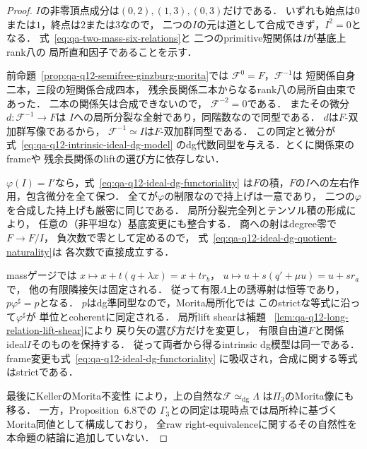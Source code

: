 \begin{proof}
$I$の非零頂点成分は$(0,2),(1,3),(0,3)$だけである．
いずれも始点は$0$または$1$，終点は$2$または$3$なので，
二つの$I$の元は道として合成できず，$I^2=0$となる．
式~\eqref{eq:qa-two-mass-six-relations}と
二つのprimitive短関係は$I$が基底上rank八の
局所直和因子であることを示す．

前命題~\ref{prop:qa-q12-semifree-ginzburg-morita}では
$\mathscr F^0=F$，$\mathscr F^{-1}$は
短関係自身二本，三段の短関係合成四本，
残余長関係二本からなるrank八の局所自由束であった．
二本の関係矢は合成できないので，
$\mathscr F^{-2}=0$である．
またその微分$d:\mathscr F^{-1}\to F$は
$I$への局所分裂な全射であり，同階数なので同型である．
$d$は$F$-双加群写像であるから，
$\mathscr F^{-1}\simeq I$は$F$-双加群同型である．
この同定と微分が式~\eqref{eq:qa-q12-intrinsic-ideal-dg-model}
のdg代数同型を与える．とくに関係束のframeや
残余長関係のliftの選び方に依存しない．

$\varphi(I)=I'$なら，式~\eqref{eq:qa-q12-ideal-dg-functoriality}
は$F$の積，$F$の$I$への左右作用，包含微分を全て保つ．
全てが$\varphi$の制限なので持上げは一意であり，
二つの$\varphi$を合成した持上げも厳密に同じである．
局所分裂完全列とテンソル積の形成により，
任意の（非平坦な）基底変更にも整合する．
商への射はdegree零で$F\to F/I$，
負次数で零として定めるので，
式~\eqref{eq:qa-q12-ideal-dg-quotient-naturality}は
各次数で直接成立する．

massゲージでは
$x\mapsto x+t(q+\lambda x)=x+t r_b$，
$u\mapsto u+s(q'+\mu u)=u+s r_a$で，
他の有限隣接矢は固定される．
従って有限$\Lambda$上の誘導射は恒等であり，
$p\varphi^\sharp=p$となる．
$p$はdg準同型なので，Morita局所化では
このstrictな等式に沿って$\varphi^\sharp$が
単位とcoherentに同定される．
局所lift shearは補題~
\ref{lem:qa-q12-long-relation-lift-shear}により
戻り矢の選び方だけを変更し，
有限自由道$F$と関係ideal$I$そのものを保持する．
従って両者から得るintrinsic dg模型は同一である．
frame変更も式~\eqref{eq:qa-q12-ideal-dg-functoriality}
に吸収され，合成に関する等式はstrictである．

最後にKellerのMorita不変性
\cite[Proposition~4.2]{KellerDeformedCY2011}
により，上の自然な$\mathscr F\simeq_{\mathrm{dg}}\Lambda$
は$\Pi_3$のMorita像にも移る．
一方，Proposition~6.8での
$\Gamma_3$との同定は現時点では局所枠に基づく
Morita同値として構成しており，
全raw right-equivalenceに関するその自然性を
本命題の結論に追加していない．
\end{proof}



